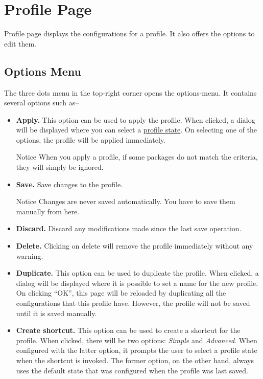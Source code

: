 \section{Profile Page}\label{sec:profile-page} %
Profile page displays the configurations for a profile. It also offers the options to edit them.

\subsection{Options Menu}\label{subsec:profile-options-menu} %
The three dots menu in the top-right corner opens the options-menu. It contains several options such as--
\begin{itemize}
    \item \textbf{Apply.} This option can be used to apply the profile. When clicked, a dialog will be displayed where
    you can select a \hyperref[subsubsec:profile-state]{profile state}. On selecting one of the options, the profile
    will be applied immediately.
    \begin{tip}{Notice}
        When you apply a profile, if some packages do not match the criteria, they will simply be ignored.
    \end{tip}

    \item \textbf{Save.} Save changes to the profile.
    \begin{warning}{Notice}
        Changes are never saved automatically. You have to save them manually from here.
    \end{warning}

    \item \textbf{Discard.} Discard any modifications made since the last save operation.

    \item \textbf{Delete.} Clicking on delete will remove the profile immediately without any warning.

    \item \textbf{Duplicate.} This option can be used to duplicate the profile. When clicked, a dialog will be displayed
    where it is possible to set a name for the new profile. On clicking ``OK'', this page will be reloaded by
    duplicating all the configurations that this profile have. However, the profile will not be saved until it is saved manually.

    \item \textbf{Create shortcut.} This option can be used to create a shortcut for the profile. When clicked, there
    will be two options: \textit{Simple} and \textit{Advanced}. When configured with the latter option, it prompts the
    user to select a profile state when the shortcut is invoked. The former option, on the other hand, always uses the
    default state that was configured when the profile was last saved.
\end{itemize}

